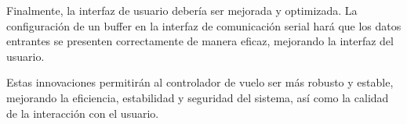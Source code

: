 Finalmente, la interfaz de usuario debería ser mejorada y optimizada. La configuración de un buffer en la interfaz de comunicación serial hará que los datos entrantes se presenten correctamente de manera eficaz, mejorando la interfaz del usuario. 

Estas innovaciones permitirán al controlador de vuelo ser más robusto y estable, mejorando la eficiencia, estabilidad y seguridad del sistema, así como la calidad de la interacción con el usuario.